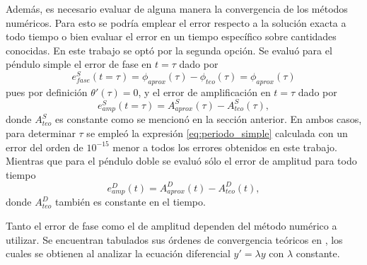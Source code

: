 \documentclass[aps,prb,twocolumn,superscriptaddress,floatfix,longbibliography,10pt]{revtex4-2}
\newcounter{para}
\begin{document}
Además, es necesario evaluar de alguna manera la convergencia de los métodos numéricos. Para esto se podría emplear el error respecto a la solución exacta a todo tiempo o bien evaluar el error en un tiempo específico sobre cantidades conocidas. En este trabajo se optó por la segunda opción. Se evaluó para el péndulo simple el error de fase en $t = \tau$ dado por
\begin{equation}
  e^S_{fase}(t = \tau) = \phi_{aprox}(\tau) - \phi_{teo}(\tau) = \phi_{aprox}(\tau)
  \label{eq:simple_e_fase}
\end{equation}
pues por definición $\theta'(\tau) = 0$, y el error de amplificación en $t = \tau$ dado por
\begin{equation}
  e^S_{amp}(t = \tau) = A^S_{aprox}(\tau) - A^S_{teo}(\tau),
  \label{eq:simple_e_amp}
\end{equation}
donde $A^S_{teo}$ es constante como se mencionó en la sección anterior. En ambos casos, para determinar $\tau$ se empleó la expresión \ref{eq:periodo_simple} calculada con un error del orden de $10^{-15}$ menor a todos los errores obtenidos en este trabajo. Mientras que para el péndulo doble se evaluó sólo el error de amplitud para todo tiempo
\begin{equation}
  e^D_{amp}(t) = A^D_{aprox}(t) - A^D_{teo}(t),
  \label{eq:doble_e_amp}
\end{equation}
donde $A^D_{teo}$ también es constante en el tiempo.

Tanto el error de fase como el de amplitud dependen del método numérico a utilizar. Se encuentran tabulados sus órdenes de convergencia teóricos en \cite{Notas_materia}, los cuales se obtienen al analizar la ecuación diferencial $y' = \lambda y$ con $\lambda$ constante.
\end{document}
